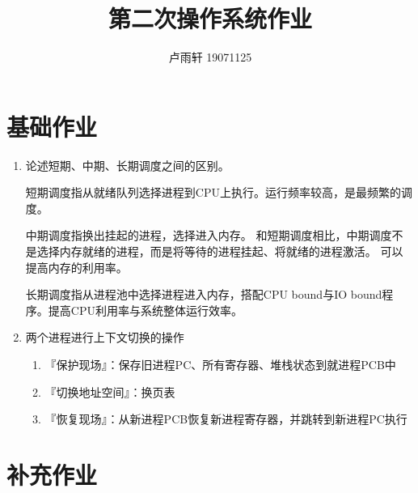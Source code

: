 \documentclass{ctexart}
\title{第二次操作系统作业}
\author{卢雨轩 19071125}
\begin{document}
\maketitle

\section*{基础作业}
\begin{enumerate}
\item 论述短期、中期、长期调度之间的区别。

短期调度指从就绪队列选择进程到CPU上执行。运行频率较高，是最频繁的调度。

中期调度指换出挂起的进程，选择进入内存。
和短期调度相比，中期调度不是选择内存就绪的进程，而是将等待的进程挂起、将就绪的进程激活。
可以提高内存的利用率。

长期调度指从进程池中选择进程进入内存，搭配CPU bound与IO bound程序。提高CPU利用率与系统整体运行效率。

\item 两个进程进行上下文切换的操作
    \begin{enumerate}
        \item 『保护现场』：保存旧进程PC、所有寄存器、堆栈状态到就进程PCB中
        \item 『切换地址空间』：换页表
        \item 『恢复现场』：从新进程PCB恢复新进程寄存器，并跳转到新进程PC执行
    \end{enumerate}
\end{enumerate}

\section*{补充作业}
\end{document}
